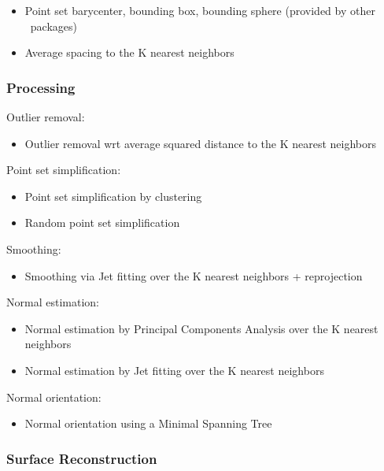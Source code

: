\begin{itemize}
\item Point set barycenter, bounding box, bounding sphere (provided by other \cgal\ packages)
\item Average spacing to the K nearest neighbors
\end{itemize}


\subsubsection{Processing}

Outlier removal:

\begin{itemize}
\item Outlier removal wrt average squared distance to the K nearest neighbors
\end{itemize}

Point set simplification:

\begin{itemize}
\item Point set simplification by clustering
\item Random point set simplification
\end{itemize}

Smoothing:

\begin{itemize}
\item Smoothing via Jet fitting over the K nearest neighbors + reprojection
\end{itemize}

Normal estimation:

\begin{itemize}
\item Normal estimation by Principal Components Analysis over the K nearest neighbors
\item Normal estimation by Jet fitting over the K nearest neighbors
\end{itemize}

Normal orientation:

\begin{itemize}
\item Normal orientation using a Minimal Spanning Tree \cite{cgal:hddms-srup-92}
\end{itemize}


\subsubsection{Surface Reconstruction}

